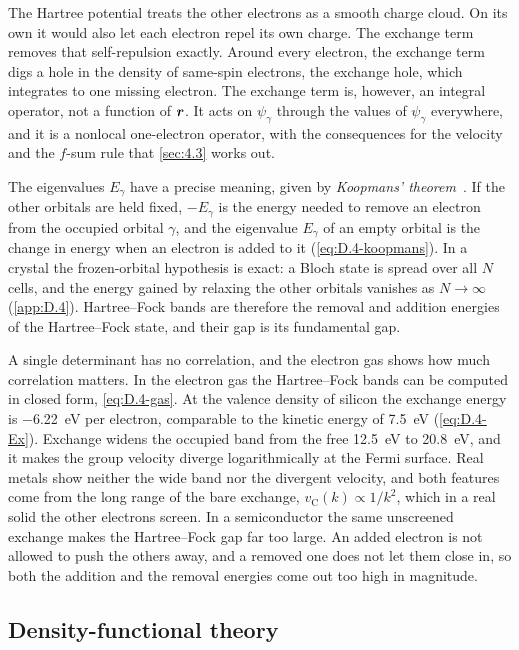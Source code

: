 The Hartree potential treats the other electrons as a smooth charge cloud. On its own it would also let each electron repel its own charge. The exchange term removes that self-repulsion exactly. Around every electron, the exchange term digs a hole in the density of same-spin electrons, the exchange hole, which integrates to one missing electron. The exchange term is, however, an integral operator, not a function of $\bm{r}$. It acts on $\psi_\gamma$ through the values of $\psi_\gamma$ everywhere, and it is a nonlocal one-electron operator, with the consequences for the velocity and the $f$-sum rule that \cref{sec:4.3} works out.

The eigenvalues $E_\gamma$ have a precise meaning, given by \emph{Koopmans' theorem}~\cite{koopmans1934zuordnung}. If the other orbitals are held fixed, $-E_\gamma$ is the energy needed to remove an electron from the occupied orbital $\gamma$, and the eigenvalue $E_\gamma$ of an empty orbital is the change in energy when an electron is added to it (\cref{eq:D.4-koopmans}). In a crystal the frozen-orbital hypothesis is exact: a Bloch state is spread over all $N$ cells, and the energy gained by relaxing the other orbitals vanishes as $N \to \infty$ (\cref{app:D.4}). Hartree--Fock bands are therefore the removal and addition energies of the Hartree--Fock state, and their gap is its fundamental gap.

A single determinant has no correlation, and the electron gas shows how much correlation matters. In the electron gas the Hartree--Fock bands can be computed in closed form, \cref{eq:D.4-gas}. At the valence density of silicon the exchange energy is \SI{-6.22}{eV} per electron, comparable to the kinetic energy of \SI{7.5}{eV} (\cref{eq:D.4-Ex}). Exchange widens the occupied band from the free \SI{12.5}{eV} to \SI{20.8}{eV}, and it makes the group velocity diverge logarithmically at the Fermi surface. Real metals show neither the wide band nor the divergent velocity, and both features come from the long range of the bare exchange, $v_{\mathrm{C}}(k) \propto 1/k^2$, which in a real solid the other electrons screen. In a semiconductor the same unscreened exchange makes the Hartree--Fock gap far too large. An added electron is not allowed to push the others away, and a removed one does not let them close in, so both the addition and the removal energies come out too high in magnitude.

\subsection{Density-functional theory}

